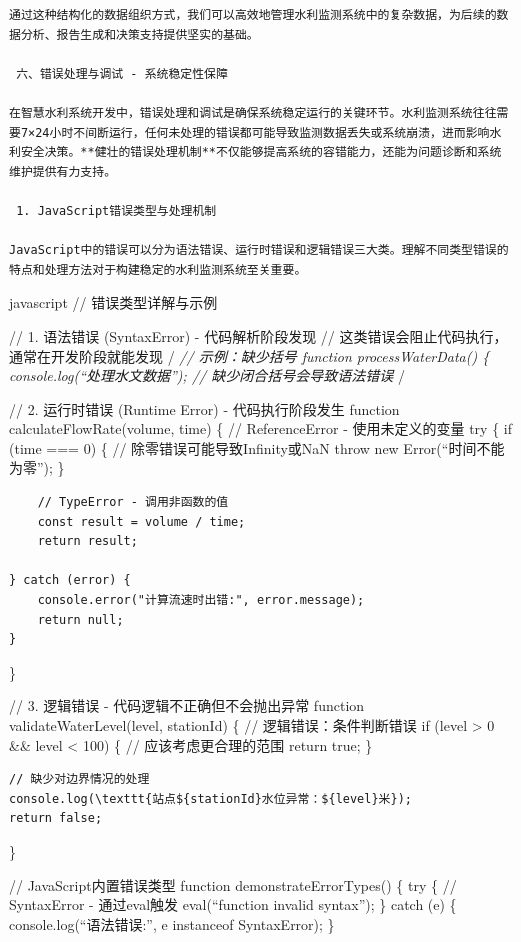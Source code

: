 {\begin{lstlisting}
通过这种结构化的数据组织方式，我们可以高效地管理水利监测系统中的复杂数据，为后续的数据分析、报告生成和决策支持提供坚实的基础。

 六、错误处理与调试 - 系统稳定性保障

在智慧水利系统开发中，错误处理和调试是确保系统稳定运行的关键环节。水利监测系统往往需要7×24小时不间断运行，任何未处理的错误都可能导致监测数据丢失或系统崩溃，进而影响水利安全决策。**健壮的错误处理机制**不仅能够提高系统的容错能力，还能为问题诊断和系统维护提供有力支持。

 1. JavaScript错误类型与处理机制

JavaScript中的错误可以分为语法错误、运行时错误和逻辑错误三大类。理解不同类型错误的特点和处理方法对于构建稳定的水利监测系统至关重要。
\end{lstlisting}

javascript // 错误类型详解与示例

// 1. 语法错误 (SyntaxError) - 代码解析阶段发现 // 这类错误会阻止代码执行，通常在开发阶段就能发现 /\emph{ // 示例：缺少括号 function processWaterData() \{ console.log(``处理水文数据''); // 缺少闭合括号会导致语法错误 }/

// 2. 运行时错误 (Runtime Error) - 代码执行阶段发生 function calculateFlowRate(volume, time) \{ // ReferenceError - 使用未定义的变量 try \{ if (time === 0) \{ // 除零错误可能导致Infinity或NaN throw new Error(``时间不能为零''); \}

\begin{verbatim}
    // TypeError - 调用非函数的值
    const result = volume / time;
    return result;
    
} catch (error) {
    console.error("计算流速时出错:", error.message);
    return null;
}
\end{verbatim}

\}

// 3. 逻辑错误 - 代码逻辑不正确但不会抛出异常 function validateWaterLevel(level, stationId) \{ // 逻辑错误：条件判断错误 if (level \textgreater{} 0 \&\& level \textless{} 100) \{ // 应该考虑更合理的范围 return true; \}

\begin{verbatim}
// 缺少对边界情况的处理
console.log(\texttt{站点${stationId}水位异常：${level}米});
return false;
\end{verbatim}

\}

// JavaScript内置错误类型 function demonstrateErrorTypes() \{ try \{ // SyntaxError - 通过eval触发 eval(``function invalid syntax''); \} catch (e) \{ console.log(``语法错误:'', e instanceof SyntaxError); \}

}
